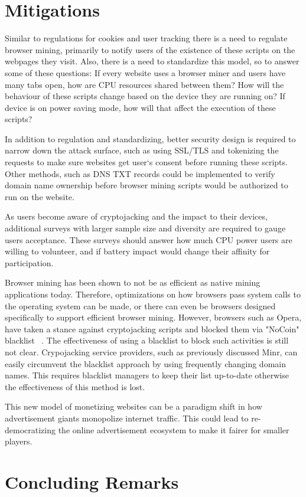 
\section{Mitigations}

Similar to regulations for cookies and user tracking there is a need to regulate browser mining, primarily to notify users of the existence of these scripts on the webpages they visit. Also, there is a need to standardize this model, so to answer some of these questions: If every website uses a browser miner and users have many tabs open, how are CPU resources shared between them? How will the behaviour of these scripts change based on the device they are running on? If device is on power saving mode, how will that affect the execution of these scripts?

In addition to regulation and standardizing, better security design is required to narrow down the attack surface, such as using SSL/TLS and tokenizing the requests to make sure websites get user`s consent before running these scripts. Other methods, such as DNS TXT records could be implemented to verify domain name ownership before browser mining scripts would be authorized to run on the website.

As users become aware of cryptojacking and the impact to their devices, additional surveys with larger sample size and diversity are required to gauge users acceptance. These surveys should answer how much CPU power users are willing to volunteer, and if battery impact would change their affinity for participation.

Browser mining has been shown to not be as efficient as native mining applications today. Therefore, optimizations on how browsers pass system calls to the operating system can be made, or there can even be browsers designed specifically to support efficient browser mining. However, browsers such as Opera, have taken a stance against cryptojacking scripts and blocked them via "NoCoin" blacklist ~\cite{operanocoin}. The effectiveness of using a blacklist to block such activities is still not clear. Crypojacking service providers, such as previously discussed Minr, can easily circumvent the blacklist approach by using frequently changing domain names. This requires blacklist managers to keep their list up-to-date otherwise the effectiveness of this method is lost.

This new model of monetizing websites can be a paradigm shift in how advertisement giants monopolize internet traffic. This could lead to re-democratizing the online advertisement ecosystem to make it fairer for smaller players.


\section{Concluding Remarks}




















